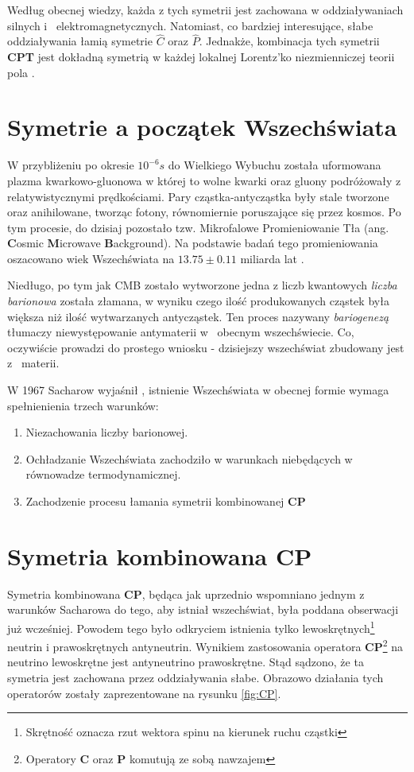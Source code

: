 Według obecnej wiedzy, każda z tych symetrii jest zachowana w oddziaływaniach silnych i~ elektromagnetycznych. Natomiast, co bardziej interesujące, słabe oddziaływania łamią symetrie \textbf{$\hat{C}$} oraz  \textbf{$\hat{P}$}. Jednakże, kombinacja tych symetrii \textbf{CPT} jest dokładną symetrią w każdej lokalnej Lorentz'ko niezmienniczej teorii pola \cite{symmetry}.

\section{Symetrie a początek Wszechświata}
W przybliżeniu po okresie $10^{-6}s$ do Wielkiego Wybuchu została uformowana plazma kwarkowo-gluonowa w której to wolne kwarki oraz gluony podróżowały z relatywistycznymi prędkościami. Pary cząstka-antycząstka były stale tworzone oraz anihilowane, tworząc fotony, równomiernie poruszające się przez kosmos. Po tym procesie, do dzisiaj pozostało tzw. Mikrofalowe Promieniowanie Tła (ang. \textbf{C}osmic \textbf{M}icrowave \textbf{B}ackground). Na podstawie badań tego promieniowania oszacowano wiek Wszechświata na $13.75 \pm 0.11$ miliarda lat \cite{CMB}.

Niedługo, po tym jak CMB zostało wytworzone jedna z liczb kwantowych \textit{liczba barionowa} została złamana, w wyniku czego ilość produkowanych cząstek była większa niż ilość wytwarzanych antycząstek. Ten proces nazywany \textit{bariogenezą} tłumaczy niewystępowanie antymaterii w~ obecnym wszechświecie. Co, oczywiście prowadzi do prostego wniosku - dzisiejszy wszechświat zbudowany jest z~ materii.

W 1967 Sacharow  wyjaśnił \cite{Sacharow}, istnienie Wszechświata w obecnej formie wymaga spełnienienia trzech warunków:
\begin{enumerate}
\item Niezachowania liczby barionowej. 
\item Ochładzanie Wszechświata zachodziło w warunkach niebędących w równowadze termodynamicznej. 
\item Zachodzenie procesu łamania symetrii kombinowanej \textbf{CP} 
\end{enumerate}

\section{Symetria kombinowana \textbf{CP}}
Symetria kombinowana \textbf{CP}, będąca jak uprzednio wspomniano jednym z warunków Sacharowa do tego, aby istniał wszechświat, była poddana obserwacji już wcześniej. Powodem tego było odkryciem istnienia tylko lewoskrętnych\footnote{Skrętność oznacza rzut wektora spinu na kierunek ruchu cząstki} neutrin i prawoskrętnych antyneutrin. Wynikiem zastosowania operatora \textbf{CP}\footnote{Operatory \textbf{C} oraz \textbf{P} komutują ze sobą nawzajem} na neutrino lewoskrętne jest antyneutrino prawoskrętne. Stąd sądzono, że ta symetria jest zachowana przez oddziaływania słabe. Obrazowo działania tych operatorów zostały zaprezentowane na rysunku \ref{fig:CP}.


